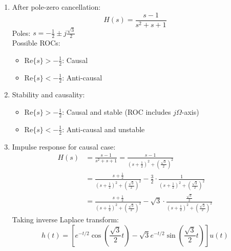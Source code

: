 \documentclass{article}
\begin{document}
\begin{enumerate}[label=(\alph*)]
    
    \item After pole-zero cancellation:
    \[ H(s) = \frac{s - 1}{s^2 + s + 1} \]
    Poles: $s = -\frac{1}{2} \pm j\frac{\sqrt{3}}{2}$ \\
    Possible ROCs:
    \begin{itemize}
        \item $\text{Re}\{s\} > -\frac{1}{2}$: Causal
        \item $\text{Re}\{s\} < -\frac{1}{2}$: Anti-causal
    \end{itemize}
    
    \item Stability and causality:
    \begin{itemize}
        \item $\text{Re}\{s\} > -\frac{1}{2}$: Causal and stable (ROC includes $j\Omega$-axis)
        \item $\text{Re}\{s\} < -\frac{1}{2}$: Anti-causal and unstable
    \end{itemize}
    
    \item Impulse response for causal case:
    \begin{align*}
        H(s) &= \frac{s - 1}{s^2 + s + 1} = \frac{s - 1}{(s + \frac{1}{2})^2 + (\frac{\sqrt{3}}{2})^2} \\
        &= \frac{s + \frac{1}{2}}{(s + \frac{1}{2})^2 + (\frac{\sqrt{3}}{2})^2} - \frac{3}{2} \cdot \frac{1}{(s + \frac{1}{2})^2 + (\frac{\sqrt{3}}{2})^2} \\
        &= \frac{s + \frac{1}{2}}{(s + \frac{1}{2})^2 + (\frac{\sqrt{3}}{2})^2} - \sqrt{3} \cdot \frac{\frac{\sqrt{3}}{2}}{(s + \frac{1}{2})^2 + (\frac{\sqrt{3}}{2})^2}
    \end{align*}
    Taking inverse Laplace transform:
    \[ h(t) = \left[e^{-t/2}\cos(\frac{\sqrt{3}}{2}t) - \sqrt{3}e^{-t/2}\sin(\frac{\sqrt{3}}{2}t)\right]u(t) \]
\end{enumerate}
\end{document}
